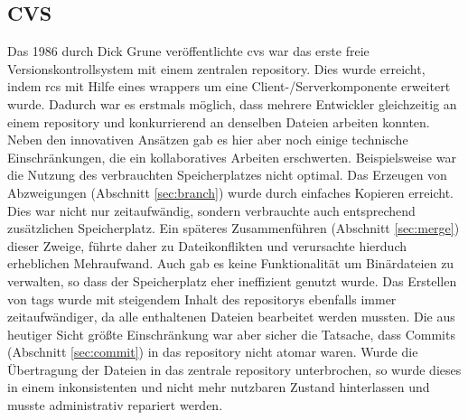 \subsection{CVS}\label{sec:cvs}
Das 1986 durch Dick Grune veröffentlichte \acrfull{cvs} war das erste freie
Versionskontrollsystem mit einem zentralen \gls{repository}. Dies wurde
erreicht, indem \acrshort{rcs} mit Hilfe eines \glspl{wrapper} um eine
Client-/Serverkomponente erweitert wurde. Dadurch war es erstmals möglich, dass
mehrere Entwickler gleichzeitig an einem \gls{repository} und konkurrierend an
denselben Dateien arbeiten konnten. Neben den innovativen Ansätzen gab es hier
aber noch einige technische Einschränkungen, die ein kollaboratives Arbeiten
erschwerten. Beispielsweise war die Nutzung des verbrauchten Speicherplatzes
nicht optimal. Das Erzeugen von Abzweigungen (Abschnitt \ref{sec:branch}) wurde
durch einfaches Kopieren erreicht. Dies war nicht nur zeitaufwändig, sondern
verbrauchte auch entsprechend zusätzlichen Speicherplatz. Ein späteres
Zusammenführen (Abschnitt \ref{sec:merge}) dieser Zweige, führte daher zu
Dateikonflikten und verursachte hierduch erheblichen Mehraufwand. Auch gab es
keine Funktionalität um Binärdateien zu verwalten, so dass der Speicherplatz
eher ineffizient genutzt wurde. Das Erstellen von \glspl{tag} wurde mit
steigendem Inhalt des \glspl{repository} ebenfalls immer zeitaufwändiger, da
alle enthaltenen Dateien bearbeitet werden mussten. Die aus heutiger Sicht
größte Einschränkung war aber sicher die Tatsache, dass Commits (Abschnitt
\ref{sec:commit}) in das \gls{repository} nicht atomar waren. Wurde die
Übertragung der Dateien in das zentrale \gls{repository} unterbrochen, so wurde
dieses in einem inkonsistenten und nicht mehr nutzbaren Zustand hinterlassen
und musste administrativ repariert werden. \cite[S.~382-383]{cd}

